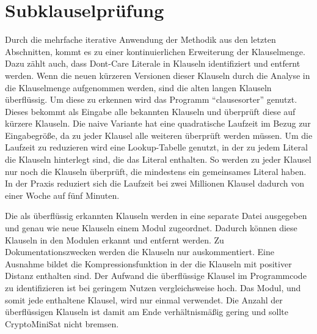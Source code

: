 \section{Subklauselprüfung}
\label{sec:ana:subclauses}

Durch die mehrfache iterative Anwendung der Methodik aus den letzten Abschnitten, kommt es zu einer kontinuierlichen Erweiterung der Klauselmenge.
Dazu zählt auch, dass Dont-Care Literale in Klauseln identifiziert und entfernt werden. Wenn die neuen kürzeren Versionen dieser Klauseln durch die
Analyse in die Klauselmenge aufgenommen werden, sind die alten langen Klauseln überflüssig. Um diese zu erkennen wird das Programm "`clausesorter"'
genutzt. Dieses bekommt als Eingabe alle bekannten Klauseln und überprüft diese auf kürzere Klauseln. Die naive Variante hat eine quadratische
Laufzeit im Bezug zur Eingabegröße, da zu jeder Klausel alle weiteren überprüft werden müssen. Um die Laufzeit zu reduzieren wird eine Lookup-Tabelle
genutzt, in der zu jedem Literal die Klauseln hinterlegt sind, die das Literal enthalten. So werden zu jeder Klausel nur noch die Klauseln überprüft,
die mindestens ein gemeinsames Literal haben. In der Praxis reduziert sich die Laufzeit bei zwei Millionen Klausel dadurch von einer Woche auf fünf Minuten.

Die als überflüssig erkannten Klauseln werden in eine separate Datei ausgegeben und genau wie neue Klauseln einem Modul zugeordnet. Dadurch können
diese Klauseln in den Modulen erkannt und entfernt werden. Zu Dokumentationszwecken werden die Klauseln nur auskommentiert. Eine Ausnahme bildet
die Kompressionsfunktion in der die Klauseln mit positiver Distanz enthalten sind. Der Aufwand die überflüssige Klausel im Programmcode zu identifizieren
ist bei geringem Nutzen vergleichsweise hoch. Das Modul, und somit jede enthaltene Klausel, wird nur einmal verwendet. Die Anzahl der überflüssigen
Klauseln ist damit am Ende verhältnismäßig gering und sollte CryptoMiniSat nicht bremsen.
